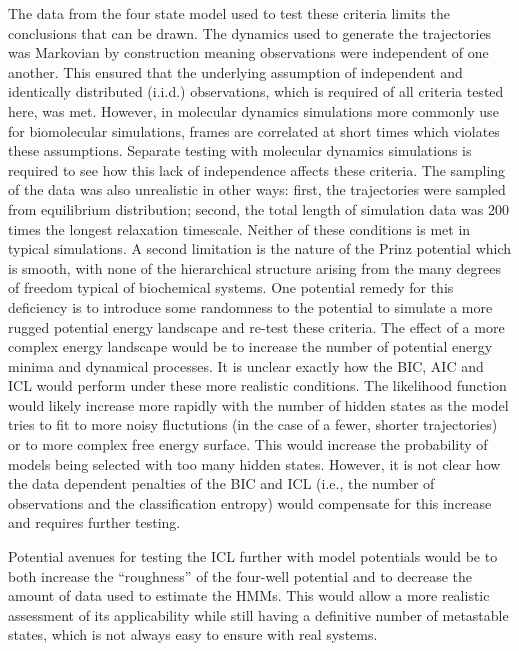 The data from the four state model used to test these criteria limits the conclusions that can be drawn. The dynamics used to generate the trajectories was Markovian by construction meaning observations were independent of one another.  This ensured that the underlying assumption of independent and identically distributed  (i.i.d.) observations, which is required of all  criteria tested here, was met. However, in molecular dynamics simulations more commonly use for biomolecular simulations, frames are correlated at short times which violates these assumptions. Separate testing with molecular dynamics simulations is required to see how this lack of independence affects these criteria. The sampling of the data was also unrealistic in other ways: first, the trajectories were sampled from equilibrium distribution; second, the total length of simulation data was 200 times the longest relaxation timescale. Neither of these conditions is met in typical simulations.  A second limitation is the nature of the Prinz potential which is smooth, with none of the  hierarchical structure arising from the many degrees of freedom typical of biochemical systems. One potential remedy for this deficiency is to introduce some randomness to the potential to simulate a more rugged potential energy landscape and re-test these criteria.  The effect of a more complex energy landscape would be to increase the number of potential energy minima and dynamical processes. It is unclear exactly how the BIC, AIC and ICL would perform under these more realistic conditions.  The likelihood function would likely increase more rapidly with the number of hidden states as the model tries to fit to more noisy fluctutions (in the case of a fewer, shorter trajectories) or to more complex free energy surface. This would increase the probability of models being selected with too many hidden states. However, it is not clear how the data dependent penalties of the BIC and ICL (i.e., the number of observations and the classification entropy) would compensate for this increase and requires further testing. 


Potential avenues for testing the ICL further with model potentials would be to both increase the ``roughness'' of the four-well potential and to decrease the amount of data used to estimate the HMMs. This would allow a more realistic assessment of its applicability while still having a definitive number of metastable states, which is not always easy to ensure with real systems. 

